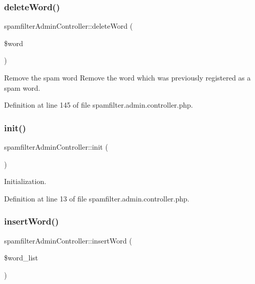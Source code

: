 \subsubsection{\texorpdfstring{delete\+Word()}{deleteWord()}}
{\footnotesize\ttfamily spamfilter\+Admin\+Controller\+::delete\+Word (\begin{DoxyParamCaption}\item[{}]{\$word }\end{DoxyParamCaption})}



Remove the spam word Remove the word which was previously registered as a spam word. 



Definition at line 145 of file spamfilter.\+admin.\+controller.\+php.

\hypertarget{classspamfilterAdminController_a28483831891491011017a8527221e3f3}{}\label{classspamfilterAdminController_a28483831891491011017a8527221e3f3} 
\subsubsection{\texorpdfstring{init()}{init()}}
{\footnotesize\ttfamily spamfilter\+Admin\+Controller\+::init (\begin{DoxyParamCaption}{ }\end{DoxyParamCaption})}



Initialization. 



Definition at line 13 of file spamfilter.\+admin.\+controller.\+php.

\hypertarget{classspamfilterAdminController_ada3859c56fb148b0e4f33266121051c0}{}\label{classspamfilterAdminController_ada3859c56fb148b0e4f33266121051c0} 
\subsubsection{\texorpdfstring{insert\+Word()}{insertWord()}}
{\footnotesize\ttfamily spamfilter\+Admin\+Controller\+::insert\+Word (\begin{DoxyParamCaption}\item[{}]{\$word\+\_\+list }\end{DoxyParamCaption})}



